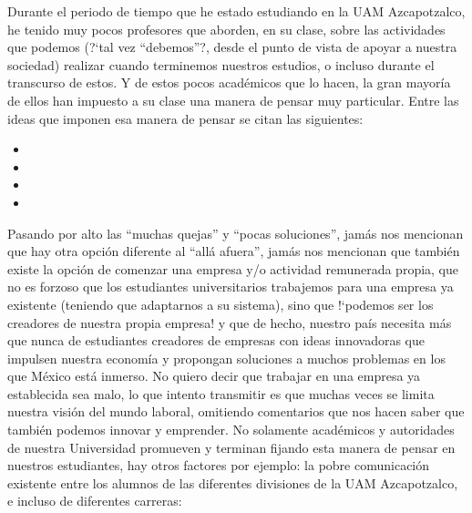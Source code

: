 \documentclass[12pt,letterpaper,titlepage]{article}
\begin{document}
Durante el periodo de tiempo que he estado estudiando en la UAM Azcapotzalco, he tenido muy pocos profesores que aborden, en su clase, sobre las actividades que podemos (?`tal vez ``debemos''?, desde el punto de vista de apoyar a nuestra sociedad) realizar cuando terminemos nuestros estudios, o incluso durante el transcurso de estos. Y de estos pocos acad\'emicos que lo hacen, la gran mayor\'ia de ellos han impuesto a su clase una manera de pensar muy particular. Entre las ideas que imponen esa manera de pensar se citan las siguientes:
\begin{itemize}
 \item {}\frqq
 \item {} \frqq
 \item {}\frqq
\item {}\frqq
\end{itemize}
 

Pasando por alto las ``muchas quejas'' y ``pocas soluciones'', jam\'as nos mencionan que hay otra opci\'on diferente al ``all\'a afuera'', jam\'as nos mencionan que tambi\'en existe la opci\'on de comenzar una empresa y/o actividad remunerada propia, que no es forzoso que los estudiantes universitarios trabajemos para una empresa ya existente (teniendo que adaptarnos a su sistema), sino que !`podemos ser los creadores de nuestra propia empresa! y que de hecho, nuestro pa\'is necesita m\'as que nunca de estudiantes creadores de empresas con ideas innovadoras que impulsen nuestra econom\'ia y propongan soluciones a muchos problemas en los que M\'exico est\'a inmerso. No quiero decir que trabajar en una empresa ya establecida sea malo, lo que intento transmitir es que muchas veces se limita nuestra visi\'on del mundo laboral, omitiendo comentarios que nos hacen saber que tambi\'en podemos innovar y emprender. No solamente acad\'emicos y autoridades de nuestra Universidad promueven y terminan fijando esta manera de pensar en nuestros estudiantes, hay otros factores por ejemplo: la pobre comunicaci\'on existente entre los alumnos de las diferentes divisiones de la UAM Azcapotzalco, e incluso de diferentes carreras:
\end{document}
